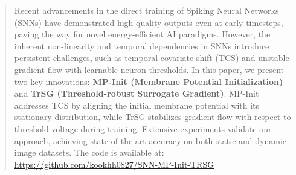 \begin{abstract}
Recent advancements in the direct training of Spiking Neural Networks (SNNs) have demonstrated high-quality outputs even at early timesteps, paving the way for novel energy-efficient AI paradigms. However, the inherent non-linearity and temporal dependencies in SNNs introduce persistent challenges, such as temporal covariate shift (TCS) and unstable gradient flow with learnable neuron thresholds. In this paper, we present two key innovations: \textbf{MP-Init (Membrane Potential Initialization)} and \textbf{TrSG (Threshold-robust Surrogate Gradient)}. MP-Init addresses TCS by aligning the initial membrane potential with its stationary distribution, while TrSG stabilizes gradient flow with respect to threshold voltage during training. Extensive experiments validate our approach, achieving state-of-the-art accuracy on both static and dynamic image datasets. The code is available at: \href{https://github.com/kookhh0827/SNN-MP-Init-TRSG}{\textcolor{mypink}{https://github.com/kookhh0827/SNN-MP-Init-TRSG}}
\end{abstract}
